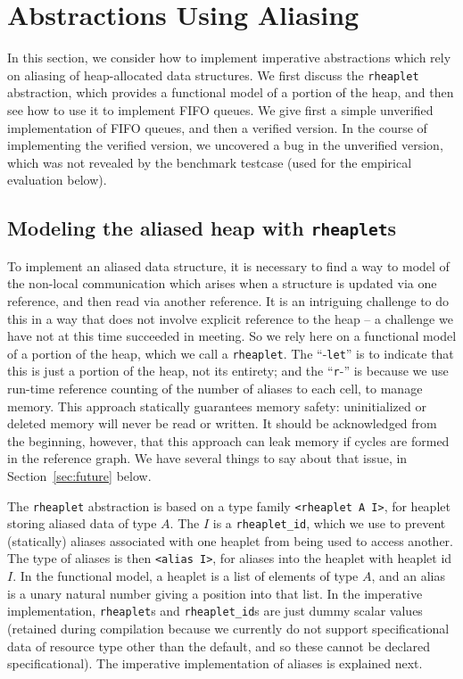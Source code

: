 \documentclass[9pt,natbib]{sigplanconf}
\begin{document}
\section{Abstractions Using Aliasing}

In this section, we consider how to implement imperative abstractions
which rely on aliasing of heap-allocated data structures.  We first
discuss the \texttt{rheaplet} abstraction, which provides a functional
model of a portion of the heap, and then see how to use it to implement
FIFO queues.  We give first a simple unverified implementation of FIFO
queues, and then a verified version.  In the course of implementing the
verified version, we uncovered a bug in the unverified version, which
was not revealed by the benchmark testcase (used for the empirical
evaluation below).

\subsection{Modeling the aliased heap with \texttt{rheaplet}s}

To implement an aliased data structure, it is necessary to find a way
to model of the non-local communication which arises when a structure
is updated via one reference, and then read via another reference.  It
is an intriguing challenge to do this in a way that does not involve
explicit reference to the heap -- a challenge we have not at this time
succeeded in meeting.  So we rely here on a functional model of a
portion of the heap, which we call a \texttt{rheaplet}.  The
``-\texttt{let}'' is to indicate that this is just a portion of the
heap, not its entirety; and the ``\texttt{r}-'' is because we use
run-time reference counting of the number of aliases to each cell, to
manage memory.  This approach statically guarantees memory safety:
uninitialized or deleted memory will never be read or written.  It
should be acknowledged from the beginning, however, that this approach
can leak memory if cycles are formed in the reference graph.  We have
several things to say about that issue, in Section~\ref{sec:future}
below.

The \texttt{rheaplet} abstraction is based on a type family
\texttt{<rheaplet A I>}, for heaplet storing aliased data of type $A$.
The $I$ is a \texttt{rheaplet\_id}, which we use to prevent
(statically) aliases associated with one heaplet from being used to
access another.  The type of aliases is then \texttt{<alias I>}, for
aliases into the heaplet with heaplet id $I$.  In the functional
model, a heaplet is a list of elements of type $A$, and an alias is a
unary natural number giving a position into that list.  In the
imperative implementation, \texttt{rheaplet}s and
\texttt{rheaplet\_id}s are just dummy scalar values (retained during
compilation because we currently do not support specificational data
of resource type other than the default, and so these cannot be
declared specificational).  The imperative implementation of aliases
is explained next.
\end{document}
